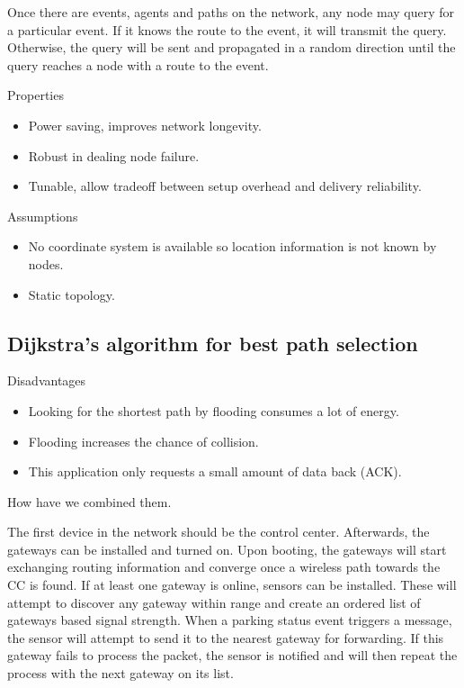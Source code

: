 Once there are events, agents and paths on the network, any node may query for a particular event. 
If it knows the route to the event, it will transmit the query. 
Otherwise, the query will be sent and propagated in a random direction until the query reaches a node with a route to the event. 

Properties
\begin{itemize}
	\item Power saving, improves network longevity.
	\item Robust in dealing node failure.
	\item Tunable, allow tradeoff between setup overhead and delivery reliability.
\end{itemize}
 Assumptions
\begin{itemize}
	\item No coordinate system is available so location information is not known by nodes.
	\item Static topology.
\end{itemize}

\subsection{Dijkstra's algorithm for best path selection}

Disadvantages
\begin{itemize}
	\item Looking for the shortest path by flooding consumes a lot of energy.
	\item Flooding increases the chance of collision.
	\item This application only requests a small amount of data back (ACK).
\end{itemize}

How have we combined them.
\bigskip

The first device in the network should be the control center. 
Afterwards, the gateways can be installed and turned on.
Upon booting, the gateways will start exchanging routing information and converge once a wireless path towards the CC is found.
If at least one gateway is online, sensors can be installed. 
These will attempt to discover any gateway within range and create an ordered list of gateways based signal strength.
When a parking status event triggers a message, the sensor will attempt to send it to the nearest gateway for forwarding. 
If this gateway fails to process the packet, the sensor is notified and will then repeat the process with the next gateway on its list.



